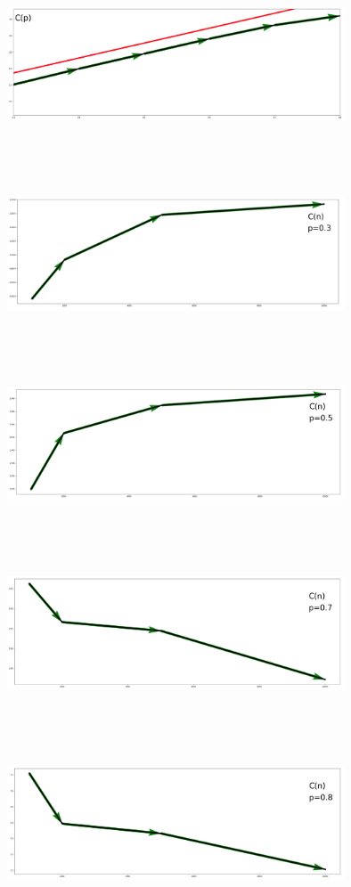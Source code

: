\documentclass[10pt, reqno]{amsart}
\begin{document}
  \\\\
  \includegraphics[width=10cm, height=5cm]{c(p)_lin_zoom.png}
  \\\\
  \includegraphics[width=10cm, height=5cm]{c(n)_03.png}
  \\\\
  \includegraphics[width=10cm, height=5cm]{c(n)_05.png}
  \\\\
  \includegraphics[width=10cm, height=5cm]{c(n)_07.png}
  \\\\
  \includegraphics[width=10cm, height=5cm]{c(n)_08.png}
  \\\\
  \newpage
\end{document}
